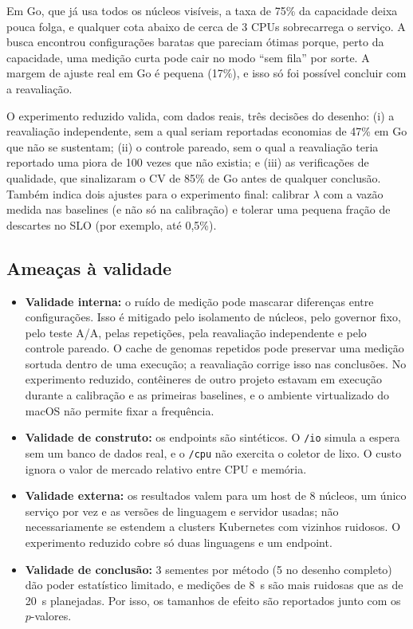 \documentclass[11pt,a4paper]{article}
\begin{document}
Em Go, que já usa todos os núcleos visíveis, a taxa de 75\% da capacidade deixa pouca folga, e qualquer cota abaixo
de cerca de 3 CPUs sobrecarrega o serviço. A busca encontrou configurações baratas que pareciam ótimas porque, perto da
capacidade, uma medição curta pode cair no modo ``sem fila'' por sorte. A margem de ajuste real em Go é pequena (17\%),
e isso só foi possível concluir com a reavaliação.

O experimento reduzido valida, com dados reais, três decisões do desenho: (i) a reavaliação independente, sem a qual
seriam reportadas economias de 47\% em Go que não se sustentam; (ii) o controle pareado, sem o qual a reavaliação teria
reportado uma piora de 100 vezes que não existia; e (iii) as verificações de qualidade, que sinalizaram o CV de 85\% de Go
antes de qualquer conclusão. Também indica dois ajustes para o experimento final: calibrar $\lambda$ com a vazão medida nas
baselines (e não só na calibração) e tolerar uma pequena fração de descartes no SLO (por exemplo, até 0,5\%).

\subsection{Ameaças à validade}

\begin{itemize}
  \item \textbf{Validade interna:} o ruído de medição pode mascarar diferenças entre configurações. Isso é mitigado pelo
    isolamento de núcleos, pelo governor fixo, pelo teste A/A, pelas repetições, pela reavaliação independente e pelo
    controle pareado. O cache de genomas repetidos pode preservar uma medição sortuda dentro de uma execução; a
    reavaliação corrige isso nas conclusões. No experimento reduzido, contêineres de outro projeto estavam em execução
    durante a calibração e as primeiras baselines, e o ambiente virtualizado do macOS não permite fixar a frequência.
  \item \textbf{Validade de construto:} os endpoints são sintéticos. O \texttt{/io} simula a espera sem um banco de dados
    real, e o \texttt{/cpu} não exercita o coletor de lixo. O custo ignora o valor de mercado relativo entre CPU e memória.
  \item \textbf{Validade externa:} os resultados valem para um host de 8 núcleos, um único serviço por vez e as versões
    de linguagem e servidor usadas; não necessariamente se estendem a clusters Kubernetes com vizinhos ruidosos.
    O experimento reduzido cobre só duas linguagens e um endpoint.
  \item \textbf{Validade de conclusão:} 3 sementes por método (5 no desenho completo) dão poder estatístico limitado,
    e medições de \SI{8}{s} são mais ruidosas que as de \SI{20}{s} planejadas. Por isso, os tamanhos de efeito são
    reportados junto com os $p$-valores.
\end{itemize}
\end{document}
